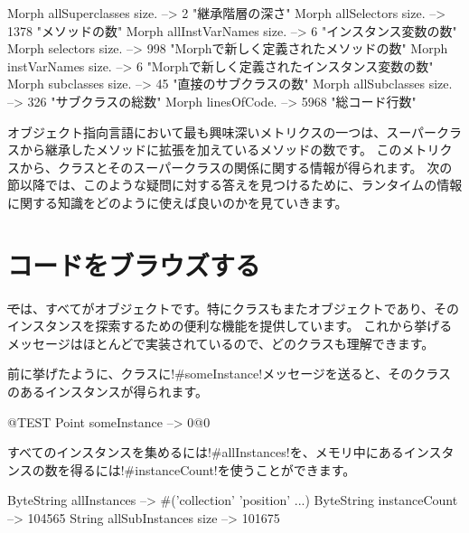 \documentclass[a4paper,10pt,twoside]{book}
\begin{document}
\begin{code}{}
Morph allSuperclasses size.  -->       2 "継承階層の深さ"
Morph allSelectors size.        --> 1378 "メソッドの数"
Morph allInstVarNames size. -->      6 "インスタンス変数の数"
Morph selectors size.             -->  998 "Morphで新しく定義されたメソッドの数"
Morph instVarNames size.     -->      6 "Morphで新しく定義されたインスタンス変数の数"
Morph subclasses size.          -->    45 "直接のサブクラスの数"
Morph allSubclasses size.      -->  326 "サブクラスの総数"
Morph linesOfCode.               --> 5968 "総コード行数"
\end{code}

オブジェクト指向言語において最も興味深いメトリクスの一つは、スーパークラスから継承したメソッドに拡張を加えているメソッドの数です。
このメトリクスから、クラスとそのスーパークラスの関係に関する情報が得られます。
次の節以降では、このような疑問に対する答えを見つけるために、ランタイムの情報に関する知識をどのように使えば良いのかを見ていきます。

\section{コードをブラウズする}

\st では、すべてがオブジェクトです。特にクラスもまたオブジェクトであり、そのインスタンスを探索するための便利な機能を提供しています。
これから挙げるメッセージはほとんどで実装されているので、どのクラスも理解できます。

前に挙げたように、クラスに\ct!#someInstance!メッセージを送ると、そのクラスのあるインスタンスが得られます。
\begin{code}{@TEST} %
Point someInstance --> 0@0
\end{code}

すべてのインスタンスを集めるには\ct!#allInstances!を、メモリ中にあるインスタンスの数を得るには\ct!#instanceCount!を使うことができます。

\begin{code}{} %
ByteString allInstances        --> #('collection' 'position'  ...)
ByteString instanceCount    --> 104565
String allSubInstances size -->  101675
\end{code}
\end{document}

